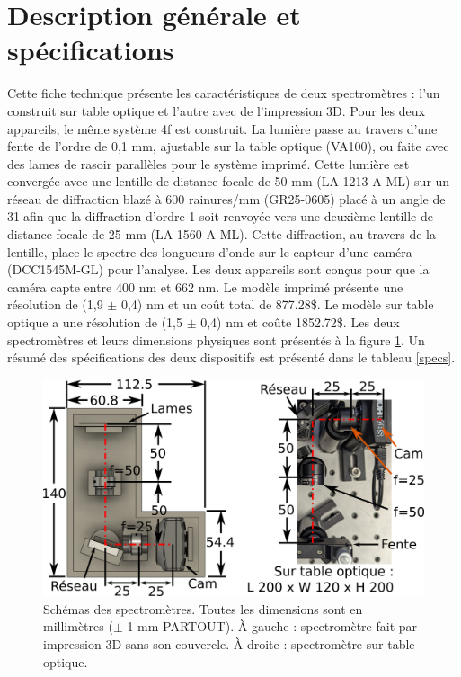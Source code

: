 \documentclass[11pt,letterpaper]{article}
\begin{document}
\section{Description générale et spécifications}

Cette fiche technique présente les caractéristiques de deux spectromètres : l'un construit sur 
table optique et l'autre avec de l'impression 3D. Pour les deux appareils, le même système 4f
est construit. La lumière passe au travers d'une fente de l'ordre de 0,1 mm, 
ajustable sur la table optique (VA100), ou faite avec des lames de rasoir parallèles pour le
système imprimé. Cette lumière est convergée avec une lentille de distance focale de 50 mm 
(LA-1213-A-ML) sur un réseau de diffraction blazé à 600 rainures/mm (GR25-0605) placé à un
angle de 31\degree $\;$afin que la diffraction d'ordre 1 soit renvoyée vers une deuxième lentille de distance focale
de 25 mm (LA-1560-A-ML). Cette diffraction, au travers de la lentille, place le spectre des 
longueurs d'onde sur le capteur d'une caméra (DCC1545M-GL) pour l'analyse. Les deux appareils
sont conçus pour que la caméra capte entre 400 nm et 662 nm. Le modèle imprimé présente une
résolution de (1,9 $\pm$ 0,4) nm et un coût total de 877.28\$. Le modèle sur
table optique a une résolution de (1,5 $\pm$ 0,4) nm et coûte 1852.72\$. Les
deux spectromètres et leurs dimensions physiques sont présentés à la figure 
\ref{schema_spectros}. Un résumé des spécifications des deux dispositifs est présenté dans le tableau \ref{specs}. 


\begin{figure}[H]
  \centering
  \includegraphics[scale=1.75]{schema_spectros.png}
  \caption{Schémas des spectromètres. Toutes les dimensions sont en millimètres ($\pm$ 1 mm PARTOUT). À gauche : spectromètre fait par impression 3D sans son couvercle. À droite : spectromètre sur table optique.}
  \label{schema_spectros}
\end{figure}
\end{document}
